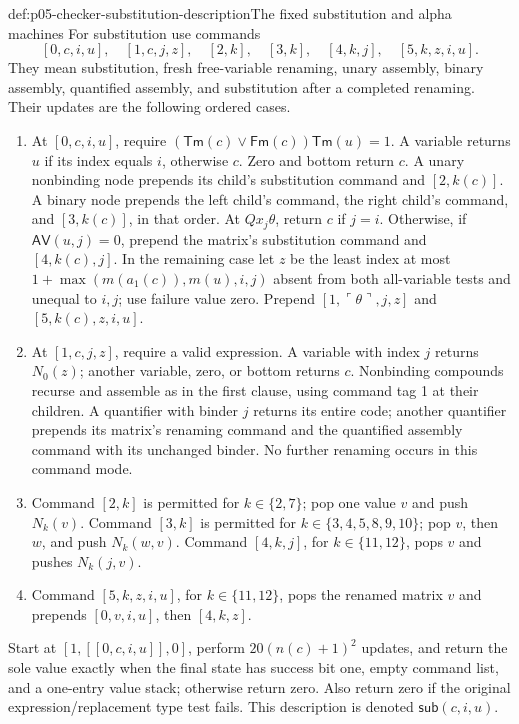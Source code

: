 \begin{hbdefinition}{def:p05-checker-substitution-description}{The fixed substitution and alpha machines}
For substitution use commands
\[
 [0,c,i,u],\quad[1,c,j,z],\quad[2,k],\quad[3,k],
 \quad[4,k,j],\quad[5,k,z,i,u].
\]
They mean substitution, fresh free-variable renaming, unary assembly, binary
assembly, quantified assembly, and substitution after a completed renaming.
Their updates are the following ordered cases.
\begin{enumerate}
\item At \([0,c,i,u]\), require
 \((\mathsf{Tm}(c)\lor\mathsf{Fm}(c))\mathsf{Tm}(u)=1\).
 A variable returns \(u\) if its index equals \(i\), otherwise \(c\).
 Zero and bottom return \(c\).  A unary nonbinding node prepends its child's
 substitution command and \([2,k(c)]\).  A binary node prepends the left
 child's command, the right child's command, and \([3,k(c)]\), in that order.
 At \(Qx_j\theta\), return \(c\) if \(j=i\).  Otherwise, if
 \(\mathsf{AV}(u,j)=0\), prepend the matrix's substitution command and
 \([4,k(c),j]\).  In the remaining case let \(z\) be the least index
 at most \(1+\max(m(a_1(c)),m(u),i,j)\) absent from both all-variable
 tests and unequal to \(i,j\); use failure value zero.  Prepend
 \([1,\ulcorner\theta\urcorner,j,z]\) and \([5,k(c),z,i,u]\).
\item At \([1,c,j,z]\), require a valid expression.  A variable with
 index \(j\) returns \(N_0(z)\); another variable, zero, or bottom returns
 \(c\).  Nonbinding compounds recurse and assemble as in the first clause,
 using command tag 1 at their children.  A quantifier with binder \(j\)
 returns its entire code; another quantifier prepends its matrix's renaming
 command and the quantified assembly command with its unchanged binder.
 No further renaming occurs in this command mode.
\item Command \([2,k]\) is permitted for \(k\in\{2,7\}\); pop
 one value \(v\) and push \(N_k(v)\).  Command \([3,k]\) is permitted
 for \(k\in\{3,4,5,8,9,10\}\); pop \(v\), then \(w\), and push
 \(N_k(w,v)\).  Command \([4,k,j]\), for \(k\in\{11,12\}\),
 pops \(v\) and pushes \(N_k(j,v)\).
\item Command \([5,k,z,i,u]\), for \(k\in\{11,12\}\), pops the
 renamed matrix \(v\) and prepends \([0,v,i,u]\), then \([4,k,z]\).
\end{enumerate}
Start at \([1,[[0,c,i,u]],0]\), perform \(20(n(c)+1)^2\) updates,
and return the sole value exactly when the final state has success bit one,
empty command list, and a one-entry value stack; otherwise return zero.
Also return zero if the original expression/replacement type test fails.
This description is denoted \(\mathsf{sub}(c,i,u)\).


\end{hbdefinition}
